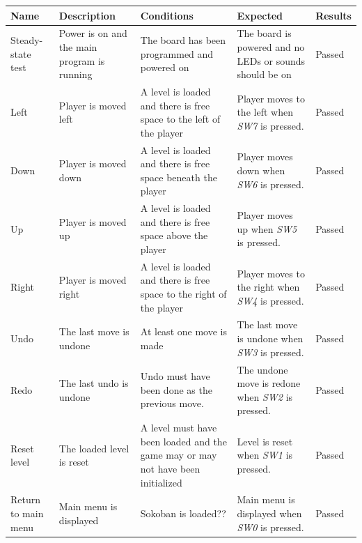 \documentclass[a4paper,11pt]{article}
\begin{document}
\begin{center}
\footnotesize
\renewcommand{\arraystretch}{1.25} %
\begin{tabular}[pos]{|m{45pt}|m{80pt}|m{90pt}|m{105pt}|m{60pt}|}
\hline  \textbf{Name} & \textbf{Description} & \textbf{Conditions} & \textbf{Expected} & \textbf{Results} \\ 

\hline Steady-state test & Power is on and the main program is running & The board has been programmed and powered on & The board is powered and no LEDs or sounds should be on & Passed \\

\hline Left & Player is moved left & A level is loaded and there is free space to the left of the player & Player moves to the left when \emph{SW7} is pressed.  & Passed \\

\hline Down & Player is moved down & A level is loaded and there is free space beneath the player & Player moves down when \emph{SW6} is pressed.  & Passed \\

\hline Up & Player is moved up & A level is loaded and there is free space above the player & Player moves up when \emph{SW5} is pressed.  & Passed \\

\hline Right & Player is moved right & A level is loaded and there is free space to the right of the player & Player moves to the right when \emph{SW4} is pressed.  & Passed \\

\hline Undo & The last move is undone & At least one move is made & The last move is undone when \emph{SW3} is pressed.  & Passed \\

\hline Redo & The last undo is undone & Undo must have been done as the previous move. & The undone move is redone when \emph{SW2} is pressed.  & Passed \\

\hline Reset level & The loaded level is reset & A level must have been loaded and the game may or may not have been initialized & Level is reset when \emph{SW1} is pressed.  & Passed \\

\hline Return to main menu & Main menu is displayed & Sokoban is loaded?? & Main menu is displayed when \emph{SW0} is pressed.  & Passed \\


\hline 
\end{tabular} 
\end{center}
\end{document}
